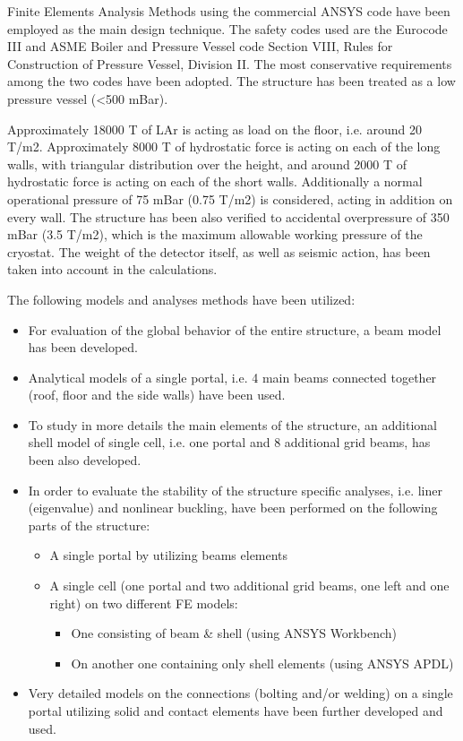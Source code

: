 Finite Elements Analysis Methods using the commercial ANSYS code 
have been employed as the main design technique. The safety codes 
used are the Eurocode III and ASME Boiler and Pressure Vessel code 
Section VIII, Rules for Construction of Pressure Vessel, 
Division II. The most conservative requirements among the two 
codes have been adopted. The structure has been treated as a 
low pressure vessel (<500 mBar). 

Approximately 18000 T of LAr is acting as load on the floor, i.e. 
around 20 T/m2. Approximately 8000 T of hydrostatic force is acting 
on each of the long walls, with triangular distribution over the 
height, and around 2000 T of hydrostatic force is acting on each 
of the short walls.  Additionally a normal operational pressure 
of 75 mBar (0.75 T/m2) is considered, acting in addition on every 
wall. The structure has been also verified to accidental overpressure 
of 350 mBar (3.5 T/m2), which is the maximum allowable working pressure 
of the cryostat.  The weight of the detector itself, as well as 
seismic action, has been taken into account in the calculations.

The following models and analyses methods have been utilized:
\begin{itemize}
 \item{For evaluation of the global behavior of the entire structure,
       a beam model has been developed.}
 \item{Analytical models of a single portal, i.e. 4 main beams 
       connected together (roof, floor and the side walls) 
       have been used.}
 \item{To study in more details the main elements of the structure, 
       an additional shell model of single cell, i.e. one portal 
       and 8 additional grid beams, has been also developed.}
 \item{In order to evaluate the stability of the structure specific 
       analyses, i.e. liner (eigenvalue) and nonlinear buckling, 
       have been performed on the following parts of the structure:}
 \begin{itemize}
  \item{A single portal by utilizing beams elements}
  \item{A single cell (one portal and two additional grid beams, one 
        left and one right) on two different FE models:}
  \begin{itemize}
   \item{One consisting of beam \& shell (using ANSYS Workbench)}
   \item{On another one containing only shell elements (using ANSYS APDL)} 
  \end{itemize}
 \end{itemize}
 \item{Very detailed models on the connections (bolting and/or welding) 
       on a single portal utilizing solid and contact elements have 
       been further developed and used.}
\end{itemize}

